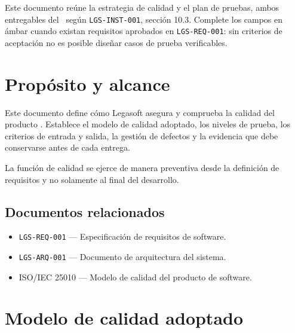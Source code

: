 \documentclass[11pt,a4paper]{article}
\begin{document}
\lgportada


\begin{porcompletar}
Este documento reúne la estrategia de calidad y el plan de pruebas, ambos
entregables del \lgQARol\ según \texttt{LGS-INST-001}, sección 10.3. Complete los
campos en ámbar cuando existan requisitos aprobados en \texttt{LGS-REQ-001}: sin
criterios de aceptación no es posible diseñar casos de prueba verificables.
\end{porcompletar}

\tableofcontents
\clearpage

\section{Propósito y alcance}

Este documento define cómo Legasoft asegura y comprueba la calidad del producto
. Establece el modelo de calidad adoptado, los niveles
de prueba, los criterios de entrada y salida, la gestión de defectos y la
evidencia que debe conservarse antes de cada entrega.

La función de calidad se ejerce de manera preventiva desde la definición de
requisitos y no solamente al final del desarrollo.

\subsection{Documentos relacionados}

\begin{itemize}
  \item \texttt{LGS-REQ-001} — Especificación de requisitos de software.
  \item \texttt{LGS-ARQ-001} — Documento de arquitectura del sistema.
  \item ISO/IEC 25010 — Modelo de calidad del producto de software.
\end{itemize}

\section{Modelo de calidad adoptado}
\end{document}

